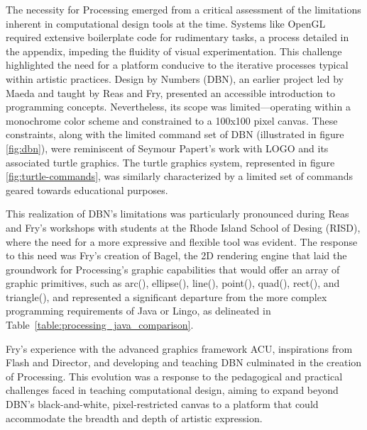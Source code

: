 The necessity for Processing emerged from a critical assessment of the limitations inherent in computational design tools at the time. Systems like OpenGL required extensive boilerplate code for rudimentary tasks, a process detailed in the appendix, impeding the fluidity of visual experimentation. This challenge highlighted the need for a platform conducive to the iterative processes typical within artistic practices.
Design by Numbers (DBN)\parencite{maedaDesignNumbers2001}, an earlier project led by Maeda and taught by Reas and Fry, presented an accessible introduction to programming concepts. Nevertheless, its scope was limited—operating within a monochrome color scheme and constrained to a 100x100 pixel canvas. These constraints, along with the limited command set of DBN (illustrated in figure \ref{fig:dbn}), were reminiscent of Seymour Papert’s work with LOGO and its associated turtle graphics. The turtle graphics system, represented in figure \ref{fig:turtle-commands}, was similarly characterized by a limited set of commands geared towards educational purposes.

This realization of DBN’s limitations was particularly pronounced during Reas and Fry’s workshops with students at the Rhode Island School of Desing (RISD), where the need for a more expressive and flexible tool was evident\parencite{fryModernPrometheusHistory2018}. The response to this need was Fry’s creation of Bagel, the 2D rendering engine that laid the groundwork for Processing’s graphic capabilities that would offer an array of graphic primitives, such as arc(), ellipse(), line(), point(), quad(), rect(), and triangle(), and represented a significant departure from the more complex programming requirements of Java or Lingo, as delineated in Table~\ref{table:processing_java_comparison}.

Fry’s experience with the advanced graphics framework ACU, inspirations from Flash and Director, and developing and teaching DBN culminated in the creation of Processing. This evolution was a response to the pedagogical and practical challenges faced in teaching computational design, aiming to expand beyond DBN’s black-and-white, pixel-restricted canvas to a platform that could accommodate the breadth and depth of artistic expression.


